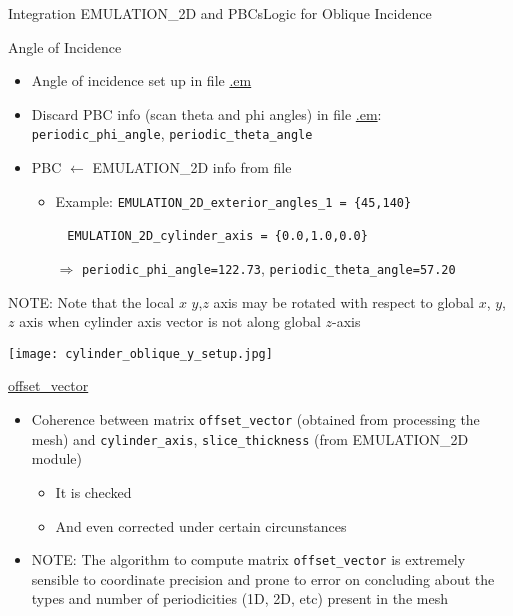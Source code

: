 \begin{frame}{Integration EMULATION\_2D and
    PBCs}{Logic for Oblique Incidence}

  \begin{block}{Angle of Incidence}
    \begin{itemize}

    \item Angle of incidence set up in file \url{.em}

    \item Discard PBC info (scan theta and phi angles) in file \url{.em}:
        \verb|periodic_phi_angle|, \verb|periodic_theta_angle|
    \item PBC $\longleftarrow$ EMULATION\_2D info from file
        \begin{itemize}
        \item Example: \verb|EMULATION_2D_exterior_angles_1 = {45,140}|
        \item[~] \verb|EMULATION_2D_cylinder_axis = {0.0,1.0,0.0}|
        \item[$\Rightarrow$] \verb|periodic_phi_angle=122.73|, \verb|periodic_theta_angle=57.20|
      \end{itemize}

    \end{itemize}
    
  \end{block}
  
  NOTE: Note that the local $x$ $y$,$z$ axis may be rotated with
  respect to global $x$, $y$, $z$ axis when cylinder axis vector
  is not along global $z$-axis
  
  
  \framebreak

  \begin{center}
    \texttt{[image: cylinder\_oblique\_y\_setup.jpg]}
  \end{center}
 
  \framebreak %
  
  \begin{block}{\url{offset_vector}}
    \begin{itemize}
    \item Coherence between matrix \verb|offset_vector| (obtained from
      processing the mesh) and \verb|cylinder_axis|,
      \verb|slice_thickness| (from EMULATION\_2D module) 
      \begin{itemize}
      \item It is checked 
      \item And even corrected under certain circunstances
      \end{itemize}
    \item \alert{NOTE:} The algorithm to compute matrix
      \verb|offset_vector| is extremely sensible to coordinate
      precision and prone to error on concluding about the types
      and number of periodicities (1D, 2D, etc) present in the mesh
      

\end{itemize}
\end{block}
\end{frame}
